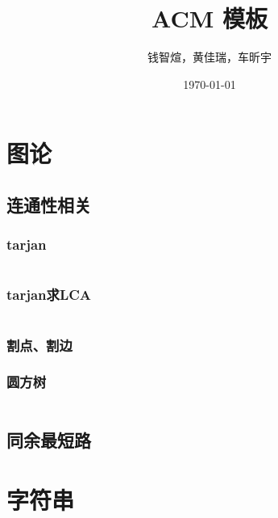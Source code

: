 \documentclass[12pt, a4paper, oneside]{ctexart}
\title{ACM 模板}
\author{钱智煊，黄佳瑞，车昕宇}
\date{\today}
\begin{document}
    \scriptsize
    \maketitle
    \newpage
    
    \begin{multicols}{2}
        \tableofcontents
        \newpage

        \section{图论}
        \subsection{连通性相关}
        \subsubsection{tarjan}
        \inputminted{cpp}{src/graph/tarjan.cpp}
        \subsubsection{tarjan求LCA}
        
        \inputminted{cpp}{src/graph/tarjan_lca.cpp}
        \subsubsection{割点、割边}
        
        \subsubsection{圆方树}
        
        \inputminted{cpp}{src/graph/圆方树.cpp}
        \subsection{同余最短路}
        
        \section{字符串}
    \end{multicols}
\end{document}
